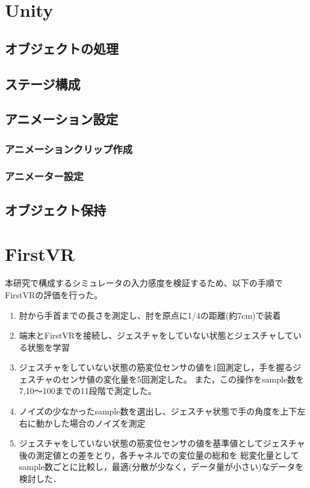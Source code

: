 \documentclass{ltjsreport}
\begin{document}
	\section{Unity}
		\subsection{オブジェクトの処理}
		\subsection{ステージ構成}
		\subsection{アニメーション設定}
			\subsubsection{アニメーションクリップ作成}
			\subsubsection{アニメーター設定}
		\subsection{オブジェクト保持}

		

	\section{FirstVR}
		本研究で構成するシミュレータの入力感度を検証するため、以下の手順でFirstVRの評価を行った。
			\begin{enumerate}
				\item 肘から手首までの長さを測定し、肘を原点に1/4の距離(約7cm)で装着 \\
				\item 端末とFirstVRを接続し、ジェスチャをしていない状態とジェスチャしている状態を学習 \\
				\item ジェスチャをしていない状態の筋変位センサの値を1回測定し，手を握るジェスチャのセンサ値の変化量を5回測定した。
					また，この操作をsample数を7,10〜100までの11段階で測定した。 \\
				\item ノイズの少なかったsample数を選出し、ジェスチャ状態で手の角度を上下左右に動かした場合のノイズを測定 \\
				\item ジェスチャをしていない状態の筋変位センサの値を基準値としてジェスチャ後の測定値との差をとり，各チャネルでの変位量の総和を
					総変化量としてsample数ごとに比較し，最適(分散が少なく，データ量が小さい)なデータを検討した．
			\end{enumerate}
\end{document}
